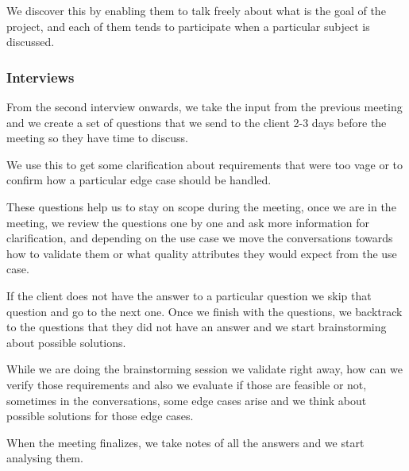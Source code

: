 \noindent We discover this by enabling them to talk freely about what is the 
goal of the project, and each of them tends to participate when a particular 
subject is discussed. \newline

\pagebreak
\subsubsection{Interviews}
From the second interview onwards, we take the input from the previous meeting 
and we create a set of questions that we send to the client 2-3 days before 
the meeting so they have time to discuss. \newline

\noindent We use this to get some clarification about requirements that were 
too vage or to confirm how a particular edge case should be handled. \newline

\noindent These questions help us to stay on scope during the meeting, once we 
are in the meeting, we review the questions one by one and ask more 
information for clarification, and depending on the use case we move the 
conversations towards how to validate them or what quality 
attributes they would expect from the use case. \newline

\noindent If the client does not have the answer to a particular question we 
skip that question and go to the next one. Once we finish with the questions, 
we backtrack to the questions that they did not have an answer and we start 
brainstorming about possible solutions.  \newline

\noindent While we are doing the brainstorming session we validate right 
away, how can we verify those requirements and also we evaluate if those are 
feasible or not, sometimes in the conversations, some edge cases arise and we 
think about possible solutions for those edge cases. \newline

\noindent When the meeting finalizes, we take notes of all the answers and we 
start analysing them.